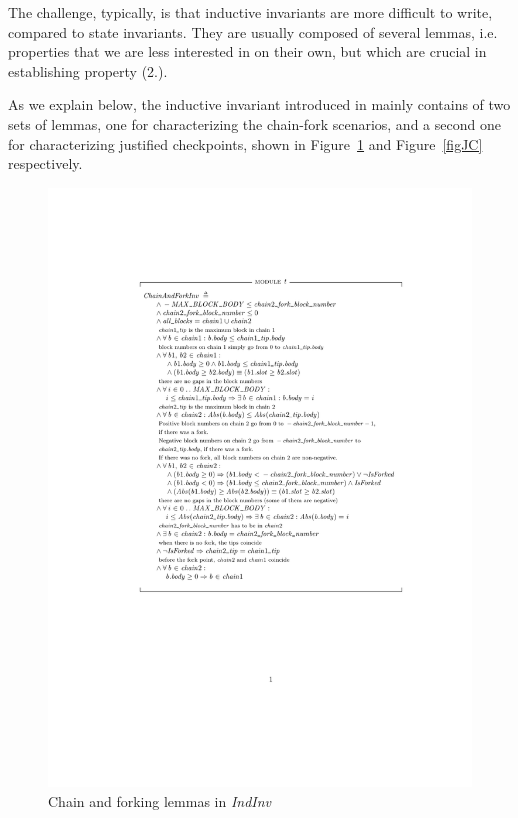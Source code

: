 The challenge, typically, is that inductive invariants are more difficult to write, compared to state invariants.
They are usually composed of several lemmas, i.e. properties that we are less interested in on their own, but which are crucial in establishing property (2.).

As we explain below, the inductive invariant introduced in \SpecFour{} mainly contains of two sets of lemmas, one for characterizing the chain-fork scenarios, and a second one for characterizing justified checkpoints, shown in Figure~\ref{figFork} and Figure~\ref{figJC} respectively.

\begin{figure}
  \includegraphics[width=\textwidth]{images/chain-and-fork-inv.pdf}
  \caption{Chain and forking lemmas in \textit{IndInv}}\label{figFork}
\end{figure}

